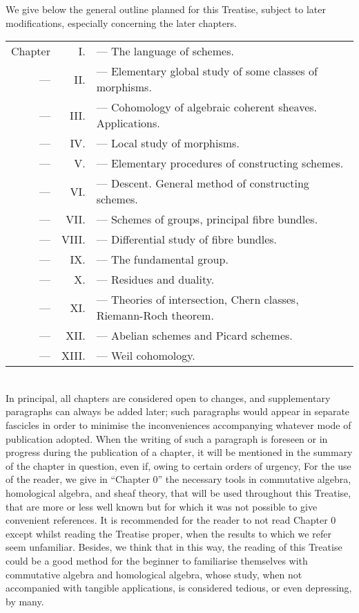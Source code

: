 \documentclass[../main.tex]{subfiles}
\begin{document}
\asttri

We give below the general outline planned for this Treatise, subject to later modifications, especially concerning the later chapters.

\begin{tabular}{rrl}
    Chapter & I. & --- The language of schemes.\\
    --- & II. & --- Elementary global study of some classes of morphisms.\\
    --- & III. & --- Cohomology of algebraic coherent sheaves. Applications.\\
    --- & IV. & --- Local study of morphisms.\\
    --- & V. & --- Elementary procedures of constructing schemes.\\
    --- & VI. & --- Descent. General method of constructing schemes.\\
    --- & VII. & --- Schemes of groups, principal fibre bundles.\\
    --- & VIII. & --- Differential study of fibre bundles.\\
    --- & IX. & --- The fundamental group.\\
    --- & X. & --- Residues and duality.\\
    --- & XI. & --- Theories of intersection, Chern classes, Riemann-Roch theorem.\\
    --- & XII. & --- Abelian schemes and Picard schemes.\\
    --- & XIII. & --- Weil cohomology.
\end{tabular}\\

In principal, all chapters are considered open to changes, and supplementary paragraphs can always be added later; such paragraphs would appear in separate fascicles in order to minimise the inconveniences accompanying whatever mode of publication adopted.
When the writing of such a paragraph is foreseen or in progress during the publication of a chapter, it will be mentioned in the summary of the chapter in question, even if, owing to certain orders of urgency, 
For the use of the reader, we give in ``Chapter 0'' the necessary tools in commutative algebra, homological algebra, and sheaf theory, that will be used throughout this Treatise, that are more or less well known but for which it was not possible to give convenient references.
It is recommended for the reader to not read Chapter 0 except whilst reading the Treatise proper, when the results to which we refer seem unfamiliar.
Besides, we think that in this way, the reading of this Treatise could be a good method for the beginner to familiarise themselves with commutative algebra and homological algebra, whose study, when not accompanied with tangible applications, is considered tedious, or even depressing, by many.
\end{document}
